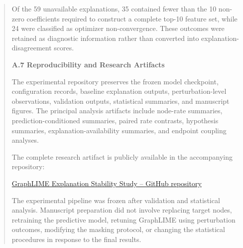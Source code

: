 \documentclass[a4paper]{article}
\begin{document}
\begin{quote}
Of the 59 unavailable explanations, 35 contained fewer than the 10
non-zero coefficients required to construct a complete top-10 feature
set, while 24 were classified as optimizer non-convergence. These
outcomes were retained as diagnostic information rather than converted
into explanation-disagreement scores.

\textbf{A.7 Reproducibility and Research Artifacts}

The experimental repository preserves the frozen model checkpoint,
configuration records, baseline explanation outputs, perturbation-level
observations, validation outputs, statistical summaries, and manuscript
figures. The principal analysis artifacts include node-rate summaries,
prediction-conditioned summaries, paired rate contrasts, hypothesis
summaries, explanation-availability summaries, and endpoint coupling
analyses.

The complete research artifact is publicly available in the accompanying
repository:

\href{https://github.com/ngclara07/graphlime-stability}{GraphLIME
Explanation Stability Study -- GitHub repository}

The experimental pipeline was frozen after validation and statistical
analysis. Manuscript preparation did not involve replacing target nodes,
retraining the predictive model, retuning GraphLIME using perturbation
outcomes, modifying the masking protocol, or changing the statistical
procedures in response to the final results.
\end{quote}
\end{document}
